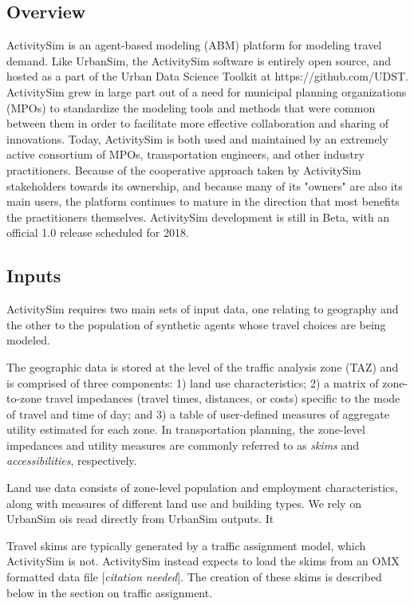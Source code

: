 \subsection{Overview}

ActivitySim is an agent-based modeling (ABM) platform for modeling travel demand. Like UrbanSim, the ActivitySim software is entirely open source, and hosted as a part of the Urban Data Science Toolkit at  https://github.com/UDST. ActivitySim grew in large part out of a need for municipal planning organizations (MPOs) to standardize the modeling tools and methods that were common between them in order to facilitate more effective collaboration and sharing of innovations. Today, ActivitySim is both used and maintained by an extremely active consortium of MPOs, transportation engineers, and other industry practitioners. Because of the cooperative approach taken by ActivitySim stakeholders towards its ownership, and because many of its "owners" are also its main users, the platform continues to mature in the direction that most benefits the practitioners themselves. ActivitySim development is still in Beta, with an official 1.0 release scheduled for 2018.

\subsection{Inputs}

ActivitySim requires two main sets of input data, one relating to geography and the other to the population of synthetic agents whose travel choices are being modeled. 
    
The geographic data is stored at the level of the traffic analysis zone (TAZ) and is comprised of three components: 1) land use characteristics; 2) a matrix of zone-to-zone travel impedances (travel times, distances, or costs) specific to the mode of travel and time of day; and 3) a table of user-defined measures of aggregate utility estimated for each zone. In transportation planning, the zone-level impedances and utility measures are commonly referred to as \textit{skims} and \textit{accessibilities}, respectively. 

Land use data consists of zone-level population and employment characteristics, along with measures of different land use and building types. We rely on UrbanSim ois read directly from UrbanSim outputs. It 

Travel skims are typically generated by a traffic assignment model, which ActivitySim is not. ActivitySim instead expects to load the skims from an OMX formatted data file [\textit{citation needed}]. The creation of these skims is described below in the section on traffic assignment.

